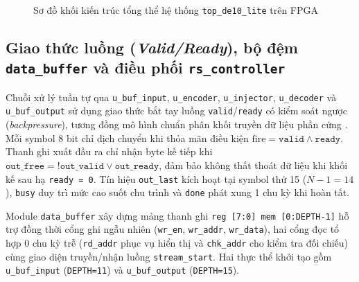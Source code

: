 \documentclass[11pt,a4paper]{report}
\begin{document}
\begin{figure}[!htb]
{%
    }
    \caption{Sơ đồ khối kiến trúc tổng thể hệ thống \texttt{top\_de10\_lite} trên FPGA}
    \label{fig:top-arch}
\end{figure}

\subsection{\texorpdfstring{Giao thức luồng (\textit{Valid/Ready}), bộ đệm \texttt{data\_buffer} và điều phối \texttt{rs\_controller}}{Giao thuc luong Valid/Ready, bo dem data\_buffer va dieu phoi rs\_controller}}
\label{subsec:streaming-ctrl}

Chuỗi xử lý tuần tự qua \texttt{u\_buf\_input}, \texttt{u\_encoder}, \texttt{u\_injector}, \texttt{u\_decoder} và \texttt{u\_buf\_output} sử dụng giao thức bắt tay luồng \texttt{valid}/\texttt{ready} có kiểm soát ngược (\textit{backpressure}), tương đồng mô hình chuẩn phân khối truyền dữ liệu phần cứng \cite{mathworksrs}. Mỗi symbol 8 bit chỉ dịch chuyển khi thỏa mãn điều kiện $\text{fire} = \texttt{valid} \wedge \texttt{ready}$. Thanh ghi xuất đầu ra chỉ nhận byte kế tiếp khi $\texttt{out\_free} = \texttt{!out\_valid} \vee \texttt{out\_ready}$, đảm bảo không thất thoát dữ liệu khi khối kế sau hạ \texttt{ready = 0}. Tín hiệu \texttt{out\_last} kích hoạt tại symbol thứ 15 ($N-1 = 14$), \texttt{busy} duy trì mức cao suốt chu trình và \texttt{done} phát xung 1 chu kỳ khi hoàn tất.

Module \texttt{data\_buffer} xây dựng mảng thanh ghi \texttt{reg [7:0] mem [0:DEPTH-1]} hỗ trợ đồng thời cổng ghi ngẫu nhiên (\texttt{wr\_en}, \texttt{wr\_addr}, \texttt{wr\_data}), hai cổng đọc tổ hợp 0 chu kỳ trễ (\texttt{rd\_addr} phục vụ hiển thị và \texttt{chk\_addr} cho kiểm tra đối chiếu) cùng giao diện truyền/nhận luồng \texttt{stream\_start}. Hai thực thể khởi tạo gồm \texttt{u\_buf\_input} (\texttt{DEPTH=11}) và \texttt{u\_buf\_output} (\texttt{DEPTH=15}).
\end{document}
